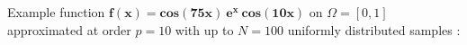 \begin{frame}{Example function}
    $\mathbf{f(x) = cos(75x)\ e^x\ cos(10x)}$ on \alert{$\Omega = [0,1]$} approximated at order \alert{$p = 10$} with up to \alert{$N = 100$} uniformly distributed samples :
    

\end{frame}



